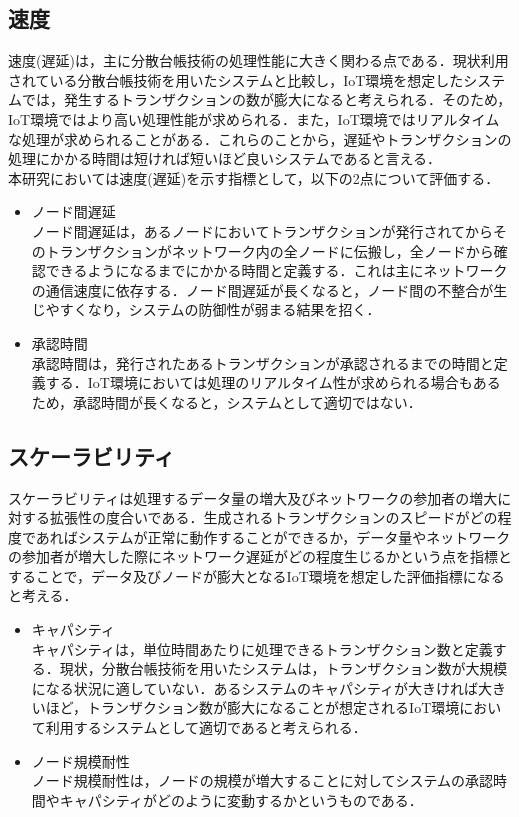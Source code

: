 \documentclass[japanese, macos]{KU2}
\begin{document}
\subsection{速度}
速度(遅延)は，主に分散台帳技術の処理性能に大きく関わる点である．現状利用されている分散台帳技術を用いたシステムと比較し，IoT環境を想定したシステムでは，発生するトランザクションの数が膨大になると考えられる．そのため，IoT環境ではより高い処理性能が求められる．また，IoT環境ではリアルタイムな処理が求められることがある．これらのことから，遅延やトランザクションの処理にかかる時間は短ければ短いほど良いシステムであると言える．\\
本研究においては速度(遅延)を示す指標として，以下の2点について評価する．
\begin{itemize}
\item ノード間遅延\\
ノード間遅延は，あるノードにおいてトランザクションが発行されてからそのトランザクションがネットワーク内の全ノードに伝搬し，全ノードから確認できるようになるまでにかかる時間と定義する．これは主にネットワークの通信速度に依存する．ノード間遅延が長くなると，ノード間の不整合が生じやすくなり，システムの防御性が弱まる結果を招く．
\item 承認時間\\
承認時間は，発行されたあるトランザクションが承認されるまでの時間と定義する．IoT環境においては処理のリアルタイム性が求められる場合もあるため，承認時間が長くなると，システムとして適切ではない．
\end{itemize}

\subsection{スケーラビリティ}
スケーラビリティは処理するデータ量の増大及びネットワークの参加者の増大に対する拡張性の度合いである．生成されるトランザクションのスピードがどの程度であればシステムが正常に動作することができるか，データ量やネットワークの参加者が増大した際にネットワーク遅延がどの程度生じるかという点を指標とすることで，データ及びノードが膨大となるIoT環境を想定した評価指標になると考える．
\begin{itemize}
\item キャパシティ\\
キャパシティは，単位時間あたりに処理できるトランザクション数と定義する．現状，分散台帳技術を用いたシステムは，トランザクション数が大規模になる状況に適していない．あるシステムのキャパシティが大きければ大きいほど，トランザクション数が膨大になることが想定されるIoT環境において利用するシステムとして適切であると考えられる．
\item ノード規模耐性\\
ノード規模耐性は，ノードの規模が増大することに対してシステムの承認時間やキャパシティがどのように変動するかというものである．
\end{itemize}
\end{document}
